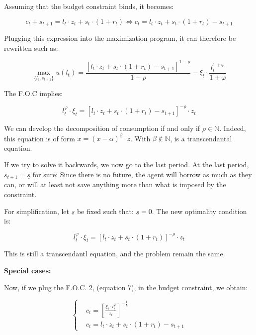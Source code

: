 \documentclass{article}
\begin{document}
Assuming that the budget constraint binds, it becomes: 

$$c_{t} + s_{t+1} = l_{t}\cdot z_{t} + s_{t}\cdot(1+r_{t})
\iff 
c_{t} = l_{t}\cdot z_{t} + s_{t}\cdot(1+r_{t}) - s_{t+1} 
$$

Plugging this expression into the maximization program, 
it can therefore be rewritten such as: 

\begin{equation}
    \max_{\{l_{\text{t}},s_{t+1}\}} u(l_{\text{t}}) = \frac{\left[l_{t}\cdot z_{t} + s_{t}\cdot (1+r_{t}) - s_{t+1} \right]^{1-\rho}}{1-\rho}-
\xi_{t}\cdot\frac{l_{t}^{1+\varphi}}{1+\varphi}
\end{equation}

The F.O.C implies: 

\begin{equation}
    l_{t}^{\varphi}\cdot \xi_{t} = \left[l_{t}\cdot z_{t} + s_{t}\cdot(1+r_{t})- s_{t+1}\right]^{-\rho}\cdot z_{t}
\end{equation}

We can develop the decomposition of consumption if and only if $\rho \in \mathbb{N}$.
Indeed, this equation is of form $x = (x-\alpha)^{\beta} \cdot z$.
With $\beta\notin \mathbb{N}$, is a transcendantal equation.


If we try to solve it backwards, we now go to the last period. 
At the last period, $s_{t+1} = \underline{s}$ for sure:
Since there is no future, 
the agent will borrow as much as they can,
or will at least not save anything more than what is imposed 
by the constraint. 

For simplification, let $\underline{s}$ be fixed such that: $\underline{s} = 0$.
The new optimality condition is: 

\begin{equation}
    l_{t}^{\varphi}\cdot \xi_{t} = \left[l_{t}\cdot z_{t} + s_{t}\cdot(1+r_{t})\right]^{-\rho}\cdot z_{t}
\end{equation}

This is still a transcendantl equation, and the problem remain the same.

\textbf{Special cases:}

Now, if we plug the F.O.C. 2, (equation 7), in the budget constraint, we obtain: 

$$
\begin{cases}
    & c_t = \left[\frac{\xi_{t}\cdot l_{t}^{\varphi}}{z_{t}}\right]^{-\frac{1}{\rho}} \\
    & c_{t} = l_{t}\cdot z_{t} + s_{t}\cdot(1+r_{t}) - s_{t+1} 
\end{cases}
$$
\end{document}
